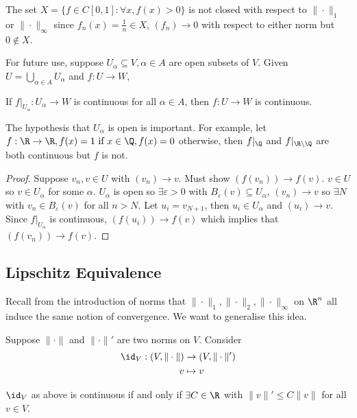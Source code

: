 \documentclass[a4paper]{article}
\theoremstyle{definition}
\begin{document}
\begin{eg}
  The set \(X=\{f\in C[0,1]: \forall x, f(x)>0\}\) is not closed with respect to \(\|\cdot\|_1\) or \(\|\cdot\|_\infty\) since \(f_n(x) = \frac{1}{n} \in X\), \((f_n) \to 0\) with respect to either norm but \(0 \notin X\).
\end{eg}

For future use, suppose \(U_\alpha \subseteq V, \alpha\in A\) are open subsets of \(V\). Given \(U = \bigcup_{\alpha\in A}U_\alpha\) and \(f: U \to W\),

\begin{prop}
  If \(f|_{U_\alpha}:U_\alpha \to W\) is continuous for all \(\alpha \in A\), then \(f: U \to W\) is continuous.
\end{prop}

\begin{note}
  The hypothesis that \(U_\alpha\) is open is important. For example, let \(f:\R\to\R, f(x) = 1 \text{ if } x\in\Q, f(x)=0\) otherwise, then \(f|_\Q\) and \(f|_{\R\setminus\Q}\) are both continuous but \(f\) is not.
\end{note}

\begin{proof}
  Suppose \(v_n, v\in U\) with \((v_n)\to v\). Must show \((f(v_n))\to f(v)\). \(v\in U\) so \(v\in U_\alpha\) for some \(\alpha\). \(U_\alpha\) is open so \(\exists \varepsilon >0\) with \(B_\varepsilon(v) \subseteq U_\alpha\), \((v_n)\to v\) so \(\exists N\) with \(v_n \in B_\varepsilon(v)\) for all \(n>N\). Let \(u_i=v_{N+1}\), then \(u_i\in U_\alpha\) and \((u_i)\to v\). Since \(f|_{U_\alpha}\) is continuous, \((f(u_i))\to f(v)\) which implies that \((f(v_n)) \to f(v)\).
\end{proof}

\subsection{Lipschitz Equivalence}

Recall from the introduction of norms that \(\|\cdot\|_1, \|\cdot\|_2, \|\cdot\|_\infty\) on \(\R^n\) all induce the same notion of convergence. We want to generalise this idea.

Suppose \(\|\cdot\|\) and \(\|\cdot\|'\) are two norms on \(V\). Consider
\begin{align*}
  \id_V:(V,\|\cdot\|) &\to (V,\|\cdot\|') \\
  v &\mapsto v
\end{align*}

\begin{prop}
  \(\id_V\) as above is continuous if and only if \(\exists C \in \R\) with \(\|v\|' \leq C \|v\|\) for all \(v \in V\).
\end{prop}
\end{document}
